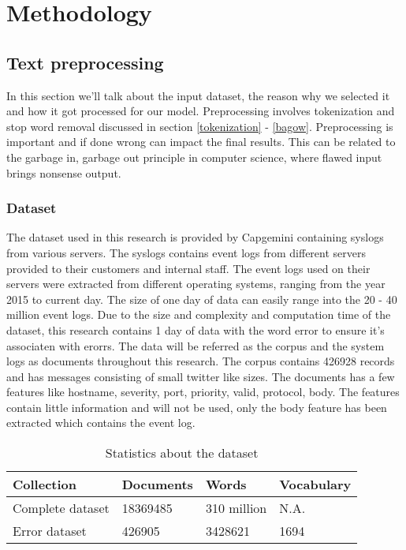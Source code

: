 \chapter{Methodology}  \label{ch:methodology}

\begin{comment}
Why did I choose my method
\end{comment}

\section{Text preprocessing}
In this section we'll talk about the input dataset, the reason why we selected it and how it got processed for our model. Preprocessing involves tokenization and stop word removal discussed in section \ref{tokenization} - \ref{bagow}. Preprocessing is important and if done wrong can impact the final results. This can be related to the garbage in, garbage out principle in computer science, where flawed input brings nonsense output. 

\subsection{Dataset}
The dataset used in this research is provided by Capgemini containing syslogs from various servers. The syslogs contains event logs from different servers provided to their customers and internal staff. The event logs used on their servers were extracted from different operating systems, ranging from the year 2015 to current day. The size of one day of data can easily range into the 20 - 40 million event logs. Due to the size and complexity and computation time of the dataset, this research contains 1 day of data with the word error to ensure it's associaten with erorrs.
The data will be referred as the corpus and the system logs as documents throughout this research. The corpus contains 426928 records and has messages consisting of small twitter like sizes. The documents has a few features like hostname, severity, port, priority, valid, protocol, body. The features contain little information and will not be used, only the body feature has been extracted which contains the event log.


\begin{table}[h]
\centering
 \begin{tabular}{|l|l|l|l|} 
 \hline
 Collection & Documents & Words & Vocabulary  \\ [0.5ex] 
 \hline\hline
 Complete dataset & 18369485 & 310 million & N.A.  \\ 
 Error dataset & 426905 & 3428621 & 1694 \\
 \hline
 \end{tabular}
\caption{Statistics about the dataset}
\label{tab:table1}
\end{table}


